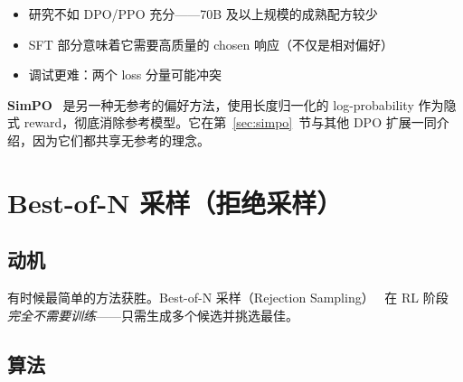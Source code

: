 \begin{warningbox}
\begin{itemize}
  \item 研究不如 DPO/PPO 充分——70B 及以上规模的成熟配方较少
  \item SFT 部分意味着它需要高质量的 chosen 响应（不仅是相对偏好）
  \item 调试更难：两个 loss 分量可能冲突
\end{itemize}
\end{warningbox}

\begin{keybox}[另见：SimPO]
\textbf{SimPO}~\cite{meng2024simpo} 是另一种无参考的偏好方法，使用长度归一化的 log-probability 作为隐式 reward，彻底消除参考模型。它在第~\ref{sec:simpo}~节与其他 DPO 扩展一同介绍，因为它们都共享无参考的理念。
\end{keybox}

\section{Best-of-N 采样（拒绝采样）}
\label{best-of-n-sampling-rejection-sampling}

\subsection{动机}
\label{motivation-4}

有时候最简单的方法获胜。Best-of-N 采样（Rejection Sampling）~\cite{nakano2021webgpt} 在 RL 阶段 \emph{完全不需要训练}——只需生成多个候选并挑选最佳。

\subsection{算法}
\label{algorithm-1}

